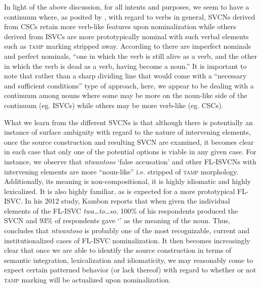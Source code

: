 \documentclass[output=paper]{../langsci/langscibook}
\begin{document}
In light of the above discussion, for all intents and purposes, we seem to have a continuum where, as posited by \citet{vendler1967}, with regard to verbs in general, SVCNs derived from CSCs retain more verb-like features upon nominalization while others derived from ISVCs are more prototypically nominal with such verbal elements such as \textsc{tamp} marking stripped away. According to \citet[131]{vendler1967} there are {imperfect nominals} and {perfect nominals}, “one in which the verb is still alive as a verb, and the other in which the verb is dead as a verb, having become a noun.” It is important to note that rather than a sharp dividing line that would come with a “necessary and sufficient conditions” type of approach, here, we appear to be dealing with a continuum among nouns where some may be more on the noun-like side of the continuum (eg. ISVCs) while others may be more verb-like (eg. CSCs). 

What we learn from the different SVCNs is that although there is potentially an instance of surface ambiguity with regard to the nature of intervening elements, once the source construction and resulting SVCN are examined, it becomes clear in each case that only one of the potential options is viable in any given case. For instance, we observe that \textit{ntwantoso} ‘{false accusation}’ and other FL-ISVCNs with intervening elements are more “noun-like” i.e. stripped of \textsc{tamp} morphology. Additionally, its meaning is non-compositional, it is highly idiomatic and highly lexicalized. It is also highly familiar, as is expected for a more prototypical FL-ISVC. In his 2012 study, Kambon reports that when given the individual elements of the FL-ISVC \textit{twa…to…so}, 100\% of his respondents produced the SVCN and 93\% of respondents gave ‘’ as the meaning of the noun. Thus, \citet{kambon2012} concludes that \textit{ntwantoso} is probably one of the most recognizable, current and institutionalized cases of FL-ISVC nominalization. It then becomes increasingly clear that once we are able to identify the source construction in terms of semantic integration, lexicalization and idiomaticity, we may reasonably come to expect certain patterned behavior (or lack thereof) with regard to whether or not \textsc{tamp} marking will be actualized upon nominalization. 
\end{document}
